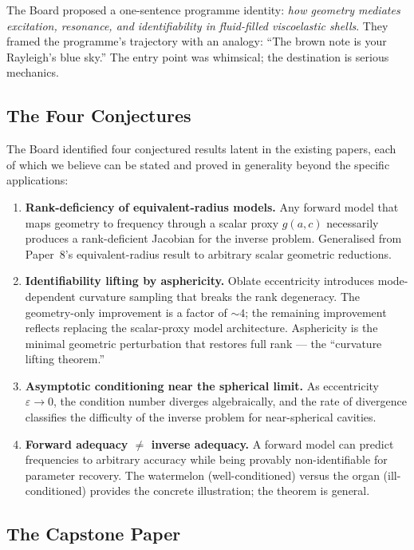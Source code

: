 \documentclass[11pt,a4paper]{article}
\begin{document}
The Board proposed a one-sentence programme identity: \emph{how geometry mediates excitation, resonance, and identifiability in fluid-filled viscoelastic shells}. They framed the programme's trajectory with an analogy: ``The brown note is your Rayleigh's blue sky.'' The entry point was whimsical; the destination is serious mechanics.

\subsection{The Four Conjectures}

The Board identified four conjectured results latent in the existing papers, each of which we believe can be stated and proved in generality beyond the specific applications:

\begin{enumerate}[leftmargin=*]
  \item \textbf{Rank-deficiency of equivalent-radius models.} Any forward model that maps geometry to frequency through a scalar proxy $g(a,c)$ necessarily produces a rank-deficient Jacobian for the inverse problem. Generalised from Paper~8's equivalent-radius result to arbitrary scalar geometric reductions.
  \item \textbf{Identifiability lifting by asphericity.} Oblate eccentricity introduces mode-dependent curvature sampling that breaks the rank degeneracy. The geometry-only improvement is a factor of $\sim 4$; the remaining improvement reflects replacing the scalar-proxy model architecture. Asphericity is the minimal geometric perturbation that restores full rank --- the ``curvature lifting theorem.''
  \item \textbf{Asymptotic conditioning near the spherical limit.} As eccentricity $\varepsilon \to 0$, the condition number diverges algebraically, and the rate of divergence classifies the difficulty of the inverse problem for near-spherical cavities.
  \item \textbf{Forward adequacy $\neq$ inverse adequacy.} A forward model can predict frequencies to arbitrary accuracy while being provably non-identifiable for parameter recovery. The watermelon (well-conditioned) versus the organ (ill-conditioned) provides the concrete illustration; the theorem is general.
\end{enumerate}

\subsection{The Capstone Paper}
\end{document}
